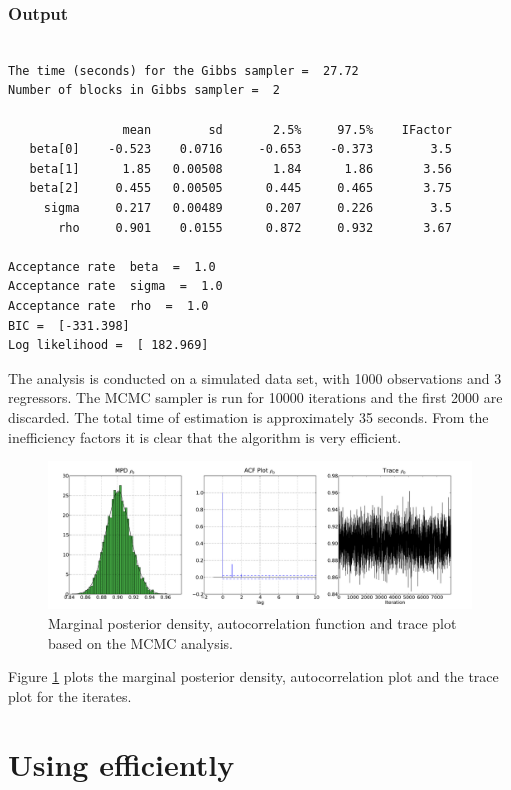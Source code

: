 \documentclass[article]{jss}
\begin{document}
\subsubsection{Output}

\begin{verbatim}

The time (seconds) for the Gibbs sampler =  27.72
Number of blocks in Gibbs sampler =  2

                mean        sd       2.5%     97.5%    IFactor
   beta[0]    -0.523    0.0716     -0.653    -0.373        3.5
   beta[1]      1.85   0.00508       1.84      1.86       3.56
   beta[2]     0.455   0.00505      0.445     0.465       3.75
     sigma     0.217   0.00489      0.207     0.226        3.5
       rho     0.901    0.0155      0.872     0.932       3.67

Acceptance rate  beta  =  1.0
Acceptance rate  sigma  =  1.0
Acceptance rate  rho  =  1.0
BIC =  [-331.398]
Log likelihood =  [ 182.969]

\end{verbatim}

The analysis is conducted on a simulated data set, with 1000 observations
and 3 regressors. The MCMC sampler is run for 10000 iterations and
the first 2000 are discarded. The total time of estimation is approximately
35 seconds. From the inefficiency factors it is clear that the algorithm
is very efficient.

%
\begin{figure}[h]
\label{Flo:AR1}
\begin{center}
  \includegraphics{rho.pdf}
\end{center}
\caption{Marginal posterior density, autocorrelation function and trace plot
based on the MCMC analysis.}

\end{figure}


Figure \ref{Flo:AR1} plots the marginal posterior density, autocorrelation
plot and the trace plot for the iterates. 


\section[Using PyMCMC  efficiently]{Using   efficiently}
\label{sec:Using-PyMCMC-efficiently}
\end{document}
